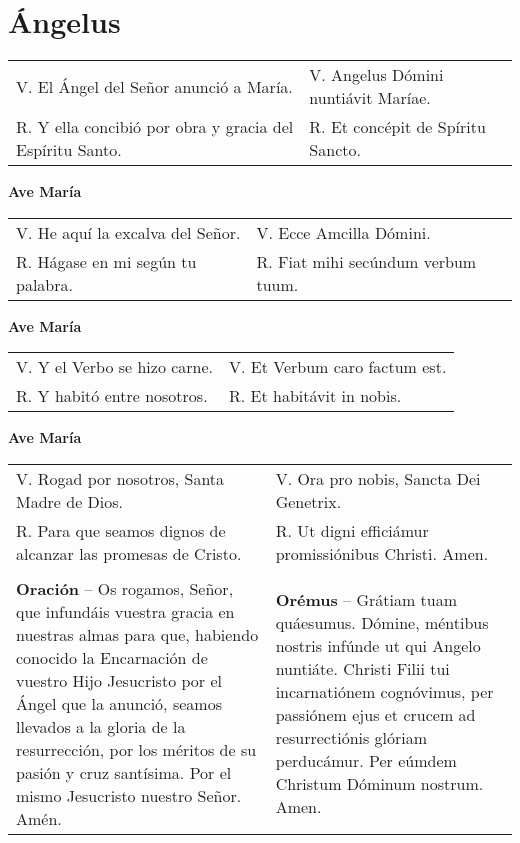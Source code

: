 \documentclass[../devocionario.tex]{subfiles}
\begin{document}
    \section{Ángelus}

    \begin{tabular} { p{} p{} }
        V. El Ángel del Señor anunció a María. & V. Angelus Dómini nuntiávit Maríae.\\
        R. Y ella concibió por obra y gracia del Espíritu Santo. & R. Et concépit de Spíritu Sancto.
    \end{tabular}

    \begin{center}
        \textbf{Ave María}
    \end{center}

    \begin{tabular} { p{} p{} }
        V. He aquí la excalva del Señor. & V. Ecce Amcilla Dómini.\\
        R. Hágase en mi según tu palabra. & R. Fiat mihi secúndum verbum tuum.
    \end{tabular}

    \begin{center}
        \textbf{Ave María}
    \end{center}

    \begin{tabular} { p{} p{} }
        V. Y el Verbo se hizo carne. & V. Et Verbum caro factum est.\\
        R. Y habitó entre nosotros. & R. Et habitávit in nobis.
    \end{tabular}

    \begin{center}
        \textbf{Ave María}
    \end{center}

    \begin{tabular} { p{} p{} }
        V. Rogad por nosotros, Santa Madre de Dios. & V. Ora pro nobis, Sancta Dei Genetrix.\\
        R. Para que seamos dignos de alcanzar las promesas de Cristo. & R. Ut digni efficiámur promissiónibus Christi. Amen.\\\\
        \textbf{Oración} -- Os rogamos, Señor, que infundáis vuestra gracia en nuestras almas para que, 
        habiendo conocido la Encarnación de vuestro Hijo Jesucristo por el Ángel que la anunció, 
        seamos llevados a la gloria de la resurrección, por los méritos de su pasión y cruz santísima. 
        Por el mismo Jesucristo nuestro Señor. Amén. & 
        \textbf{Orémus} -- Grátiam tuam quáesumus. Dómine, méntibus nostris infúnde ut qui Angelo nuntiáte. 
        Christi Filii tui incarnatiónem cognóvimus, per passiónem ejus et crucem ad resurrectiónis glóriam perducámur. 
        Per eúmdem Christum Dóminum nostrum. Amen.
    \end{tabular}
\end{document}
